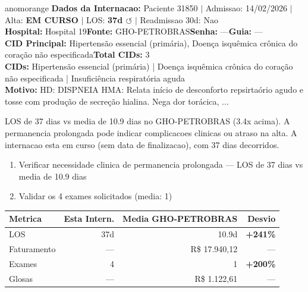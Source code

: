 \documentclass[a4paper,10pt]{article}
\begin{document}
\begin{anomalycard}[Internacao 165688 | GHO-PETROBRAS | ALTO (z=3.49)]{anomorange}
\textbf{Dados da Internacao:} Paciente 31850 $\mid$ Admissao: 14/02/2026 $\mid$ Alta: \textcolor{anomorange}{\textbf{EM CURSO}} $\mid$ LOS: \textbf{37d \textcolor{anomorange}{$\circlearrowleft$}} $\mid$ Readmissao 30d: Nao\\
\textbf{Hospital:} Hospital 19\quad\textbf{Fonte:} GHO-PETROBRAS\quad\textbf{Senha:} ---\quad\textbf{Guia:} ---\\
\textbf{CID Principal:} {\small Hipertensão essencial (primária), Doença isquêmica crônica do coração não especificada}\quad\textbf{Total CIDs:} 3\\

\textbf{CIDs:} {\scriptsize Hipertensão essencial (primária) | Doença isquêmica crônica do coração não especificada | Insuficiência respiratória aguda}\\

\textbf{Motivo:} {\scriptsize HD: DISPNEIA  HMA: Relata início de desconforto repsirtaório agudo e tosse com produção de secreção hialina. Nega dor torácica, ...}\\

\vspace{2pt}\begin{tcolorbox}[colback=severityred!20,colframe=anomorange,title={\textbf{Interpretacao de Negocio}},fonttitle=\bfseries\small,left=4pt,right=4pt,top=3pt,bottom=3pt]
{\small LOS de 37 dias vs media de 10.9 dias no GHO-PETROBRAS (3.4x acima). A permanencia prolongada pode indicar complicacoes clinicas ou atraso na alta. A internacao esta em curso (sem data de finalizacao), com 37 dias decorridos.}
\end{tcolorbox}
\begin{tcolorbox}[colback=severityyellow!30,colframe=anomorange,title={\textbf{Recomendacoes Especificas}},fonttitle=\bfseries\small,left=4pt,right=4pt,top=3pt,bottom=3pt]
\begin{enumerate}[nosep,leftmargin=16pt]
\item {\small Verificar necessidade clinica de permanencia prolongada --- LOS de 37 dias vs media de 10.9 dias}
\item {\small Validar os 4 exames solicitados (media: 1)}
\end{enumerate}
\end{tcolorbox}
\begin{center}\begin{tabular}{l r r r}\toprule\textbf{Metrica} & \textbf{Esta Intern.} & \textbf{Media GHO-PETROBRAS} & \textbf{Desvio} \\\midrule
LOS & 37d & 10.9d & \textcolor{anomred}{\textbf{+241\%}} \\
Faturamento & --- & R\$ 17.940,12 & --- \\
Exames & 4 & 1 & \textcolor{anomred}{\textbf{+200\%}} \\
Glosas & --- & R\$ 1.122,61 & --- \\
\bottomrule\end{tabular}\end{center}


\end{anomalycard}
\end{document}
